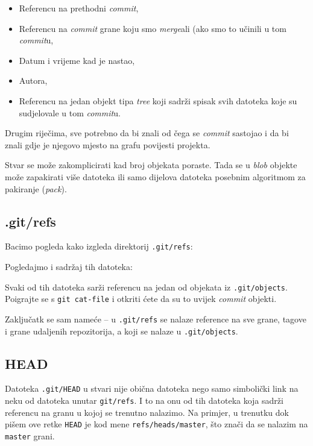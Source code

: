 \begin{itemize}
	\item Referencu na prethodni \emph{commit},
	\item Referencu na \emph{commit} grane koju smo \emph{merge}ali (ako smo to učinili u tom \emph{commit}u,
	\item Datum i vrijeme kad je nastao,
	\item Autora,
	\item Referencu na jedan objekt tipa \emph{tree} koji sadrži spisak svih datoteka koje su sudjelovale u tom \emph{commit}u.
\end{itemize}

Drugim riječima, sve potrebno da bi znali od čega se \emph{commit} sastojao i da bi znali gdje je njegovo mjesto na grafu povijesti projekta.

Stvar se može zakomplicirati kad broj objekata poraste.
Tada se u \emph{blob} objekte može zapakirati više datoteka ili samo dijelova datoteka posebnim algoritmom za pakiranje (\emph{pack}).

\subsection*{.git/refs}

Bacimo pogleda kako izgleda direktorij \verb+.git/refs+:



Pogledajmo i sadržaj tih datoteka:



Svaki od tih datoteka sarži referencu na jedan od objekata iz \verb+.git/objects+. 
Poigrajte se s \verb+git cat-file+ i otkriti ćete da su to uvijek \emph{commit} objekti.

Zaključatk se sam nameće -- u \verb+.git/refs+ se nalaze reference na sve grane, tagove i grane udaljenih repozitorija, a koji se nalaze u \verb+.git/objects+.

\subsection*{HEAD}

Datoteka \verb+.git/HEAD+ u stvari nije obična datoteka nego samo simbolički link na neku od datoteka unutar \verb+git/refs+.
I to na onu od tih datoteka koja sadrži referencu na granu u kojoj se trenutno nalazimo.
Na primjer, u trenutku dok pišem ove retke \verb+HEAD+ je kod mene \verb+refs/heads/master+, što znači da se nalazim na \verb+master+ grani.

